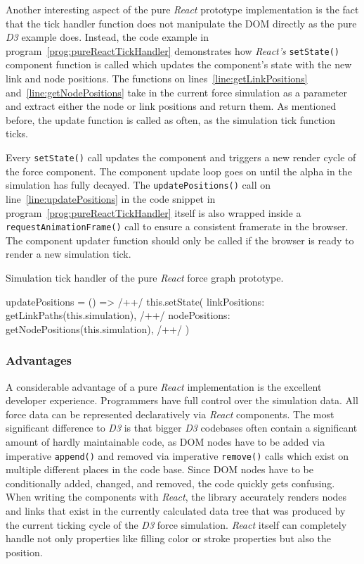 Another interesting aspect of the pure \emph{React} prototype implementation is the fact that the tick handler function does not manipulate the DOM directly as the pure \emph{D3} example does. Instead, the code example in program~\ref{prog:pureReactTickHandler} demonstrates how \emph{React's} \texttt{setState()} component function is called which updates the component's state with the new link and node positions. The functions on lines~\ref{line:getLinkPositions} and~\ref{line:getNodePositions} take in the current force simulation as a parameter and extract either the node or link positions and return them. As mentioned before, the update function is called as often, as the simulation tick function ticks. 

Every \texttt{setState()} call updates the component and triggers a new render cycle of the force component. The component update loop goes on until the alpha in the simulation has fully decayed. The \texttt{updatePositions()} call on line~\ref{line:updatePositions} in the code snippet in program~\ref{prog:pureReactTickHandler} itself is also wrapped inside a \texttt{requestAnimationFrame()} call to ensure a consistent framerate in the browser. The component updater function should only be called if the browser is ready to render a new simulation tick.

\begin{program}
\caption{Simulation tick handler of the pure \emph{React} force graph prototype.}
\label{prog:pureReactTickHandler}
\begin{JsCode}
updatePositions = () => { /+\label{line:updatePositions}+/
  this.setState({
    linkPositions: getLinkPaths(this.simulation), /+\label{line:getLinkPositions}+/
    nodePositions: getNodePositions(this.simulation), /+\label{line:getNodePositions}+/
  })
}
\end{JsCode}
\end{program}

\subsubsection{Advantages}


A considerable advantage of a pure \emph{React} implementation is the excellent developer experience. Programmers have full control over the simulation data. All force data can be represented declaratively via \emph{React} components. The most significant difference to \emph{D3} is that bigger \emph{D3} codebases often contain a significant amount of hardly maintainable code, as DOM nodes have to be added via imperative \texttt{append()} and removed via imperative \texttt{remove()} calls which exist on multiple different places in the code base. Since DOM nodes have to be conditionally added, changed, and removed, the code quickly gets confusing. When writing the components with \emph{React}, the library accurately renders nodes and links that exist in the currently calculated data tree that was produced by the current ticking cycle of the \emph{D3} force simulation. \emph{React} itself can completely handle not only properties like filling color or stroke properties but also the position.

